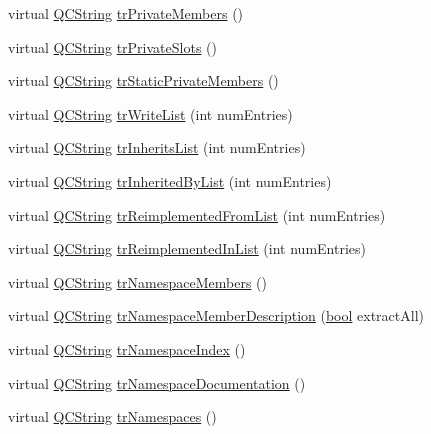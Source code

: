 \begin{DoxyCompactItemize}
\item 
virtual \hyperlink{class_q_c_string}{Q\+C\+String} \hyperlink{class_translator_norwegian_a98bbc3ebc44360a038d26dc9966f2b5a}{tr\+Private\+Members} ()
\item 
virtual \hyperlink{class_q_c_string}{Q\+C\+String} \hyperlink{class_translator_norwegian_a5b2581e2357279017ab71c62289f3c39}{tr\+Private\+Slots} ()
\item 
virtual \hyperlink{class_q_c_string}{Q\+C\+String} \hyperlink{class_translator_norwegian_a3f51f8eea43429809f3825ed553b7719}{tr\+Static\+Private\+Members} ()
\item 
virtual \hyperlink{class_q_c_string}{Q\+C\+String} \hyperlink{class_translator_norwegian_a9a778642085f53f98ef05c1e4b6db7f1}{tr\+Write\+List} (int num\+Entries)
\item 
virtual \hyperlink{class_q_c_string}{Q\+C\+String} \hyperlink{class_translator_norwegian_a2b9e664b354be825117c1d2847f15e49}{tr\+Inherits\+List} (int num\+Entries)
\item 
virtual \hyperlink{class_q_c_string}{Q\+C\+String} \hyperlink{class_translator_norwegian_aa502aa5abad02bfb785ed1575f2d61ff}{tr\+Inherited\+By\+List} (int num\+Entries)
\item 
virtual \hyperlink{class_q_c_string}{Q\+C\+String} \hyperlink{class_translator_norwegian_a3698ea1a6022ce90bc1fdfeec9107a38}{tr\+Reimplemented\+From\+List} (int num\+Entries)
\item 
virtual \hyperlink{class_q_c_string}{Q\+C\+String} \hyperlink{class_translator_norwegian_a98857e9c8814edbf6902174f189431da}{tr\+Reimplemented\+In\+List} (int num\+Entries)
\item 
virtual \hyperlink{class_q_c_string}{Q\+C\+String} \hyperlink{class_translator_norwegian_ae84636b174085a859d8148f19f9269af}{tr\+Namespace\+Members} ()
\item 
virtual \hyperlink{class_q_c_string}{Q\+C\+String} \hyperlink{class_translator_norwegian_ac3e851e771f6d68cd6e1b8927b3af0d5}{tr\+Namespace\+Member\+Description} (\hyperlink{qglobal_8h_a1062901a7428fdd9c7f180f5e01ea056}{bool} extract\+All)
\item 
virtual \hyperlink{class_q_c_string}{Q\+C\+String} \hyperlink{class_translator_norwegian_a9ad74ebb1b841012158985eeff47bfcf}{tr\+Namespace\+Index} ()
\item 
virtual \hyperlink{class_q_c_string}{Q\+C\+String} \hyperlink{class_translator_norwegian_aecd64d94d95be5bc4bd4dada4e589c2c}{tr\+Namespace\+Documentation} ()
\item 
virtual \hyperlink{class_q_c_string}{Q\+C\+String} \hyperlink{class_translator_norwegian_ab57d4f3c731565e70e9c669512608259}{tr\+Namespaces} ()

\end{DoxyCompactItemize}
